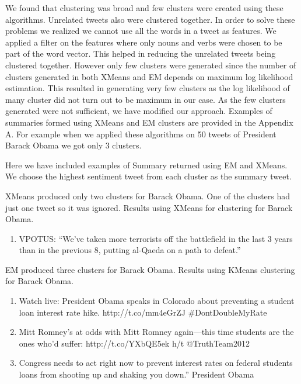  We found that clustering was broad and few clusters were created using these algorithms. Unrelated tweets also were clustered together. In order to solve these problems we realized we cannot use all the words in a tweet as features. We applied a filter on the features where only nouns and verbs were chosen to be part of the word vector. This helped in reducing the unrelated tweets being clustered together. However only few clusters were generated since the number of clusters generated in both XMeans and EM depends on maximum log likelihood estimation. This resulted in generating very few clusters as the log likelihood of many cluster did not turn out to be maximum in our case. As the few clusters generated were not sufficient, we have modified our approach. Examples of summaries formed using XMeans and EM clusters are provided in the Appendix A. For example when we applied these algorithms on 50 tweets of President Barack Obama we got only 3 clusters. 
 
Here we have included examples of Summary returned using EM and XMeans. We choose the highest sentiment tweet from each cluster as the summary tweet.

XMeans produced only two clusters for Barack Obama. One of the clusters had just one tweet so it was ignored. Results using XMeans for clustering for Barack Obama.
\begin{enumerate}
\item VPOTUS: “We’ve taken more terrorists off the battlefield in the last 3 years than in the previous 8, putting al-Qaeda on a path to defeat.”
\end{enumerate}

EM produced three clusters for Barack Obama. Results using KMeans clustering for Barack Obama.
\begin{enumerate}
\item Watch live: President Obama speaks in Colorado about preventing a student loan interest rate hike. http://t.co/mm4eGrZJ \#DontDoubleMyRate
\item Mitt Romney's at odds with Mitt Romney again—this time students are the ones who’d suffer: http://t.co/YXbQE5ek h/t @TruthTeam2012
\item Congress needs to act right now to prevent interest rates on federal students loans from shooting up and shaking you down.” President Obama
\end{enumerate}

